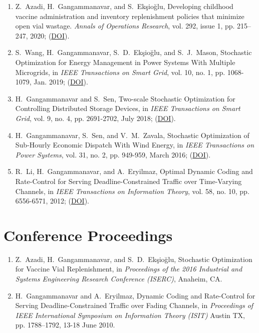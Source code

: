 \documentclass[hyperref, margin]{myResume}
\begin{document}
\begin{resume}
\begin{enumerate}[label=J\arabic*., leftmargin=*]
	\item Z.\ Azadi\footnotemark[3], H.\ Gangammanavar, and S.\ Ek{\c{s}}io{\u{g}}lu, Developing childhood vaccine administration and inventory replenishment policies that minimize open vial wastage. \textit{Annals of Operations Research}, vol. 292, issue 1, pp. 215–247, 2020; (\href{https://doi.org/10.1007/s10479-019-03164-8}{DOI}).

	\item S.\ Wang\footnotemark[3], H.\ Gangammanavar, S.\ D.\ Ek{\c{s}}io{\u{g}}lu, and S.\ J.\ Mason, Stochastic Optimization for Energy Management in Power Systems With Multiple Microgrids, in {\it IEEE Transactions on Smart Grid}, vol. 10, no. 1, pp. 1068-1079, Jan. 2019; (\href{https://doi.org/10.1109/TSG.2017.2759159}{DOI}).

	\item H.\ Gangammanavar and S.\ Sen, Two-scale Stochastic Optimization for Controlling Distributed Storage Devices, in \textit{IEEE Transactions on Smart Grid}, vol. 9, no. 4, pp. 2691-2702, July 2018; (\href{https://doi.org/10.1109/TSG.2016.2616881}{DOI}).

	\item H.\ Gangammanavar, S.\ Sen, and V.\ M.\ Zavala, Stochastic Optimization of Sub-Hourly Economic Dispatch With Wind Energy, in \textit{IEEE Transactions on Power Systems}, vol. 31, no. 2, pp. 949-959, March 2016; (\href{https://doi.org/10.1109/TPWRS.2015.2410301}{DOI}).
	
	\item R.\ Li, H.\ Gangammanavar, and A.\ Eryilmaz, Optimal Dynamic Coding and Rate-Control for Serving Deadline-Constrained Traffic over Time-Varying Channels, in \textit{IEEE Transactions on Information Theory}, vol. 58, no. 10, pp. 6556-6571, 2012; (\href{https://doi.org/10.1109/TIT.2012.2204031}{DOI}).
\end{enumerate}

\section{Conference Proceedings}
\begin{enumerate}[label=C\arabic*., leftmargin=*]
	\item  Z.\ Azadi\footnotemark[3], H.\ Gangammanavar, and S.\ D.\ Ek{\c{s}}io{\u{g}}lu, Stochastic Optimization for Vaccine Vial Replenishment, in \textit{Proceedings of the 2016 Industrial and Systems Engineering Research Conference (ISERC)}, Anaheim, CA.
	\item H.\ Gangammanavar and A.\ Eryilmaz, Dynamic Coding and Rate-Control for Serving Deadline-Constrained Traffic over Fading Channels, in \textit{Proceedings of IEEE International Symposium on Information Theory (ISIT)} Austin TX, pp. 1788--1792, 13-18 June 2010.
\end{enumerate}


\end{resume}
\end{document}
